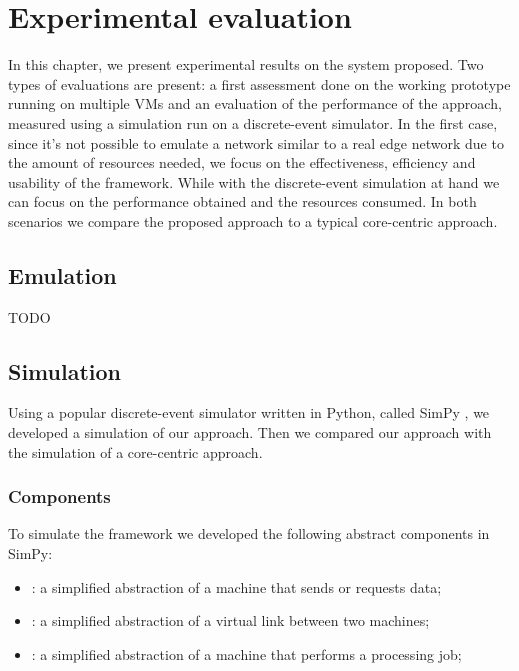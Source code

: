 \chapter{Experimental evaluation}
\label{ch:experiments}

In this chapter, we present experimental results on the system proposed. Two types of evaluations are present: a first assessment done on the working prototype running on multiple \glspl{VM} and an evaluation of the performance of the approach, measured using a simulation run on a discrete-event simulator.
In the first case, since it's not possible to emulate a network similar to a real edge network due to the amount of resources needed, we focus on the effectiveness, efficiency and usability of the framework.
While with the discrete-event simulation at hand we can focus on the performance obtained and the resources consumed.
In both scenarios we compare the proposed approach to a typical core-centric approach.



\section{Emulation}
TODO



\section{Simulation}
Using a popular discrete-event simulator written in Python, called SimPy \cite{simpy}, we developed a simulation of our approach. Then we compared our approach with the simulation of a core-centric approach.


\subsection{Components}
To simulate the framework we developed the following abstract components in SimPy:
\begin{itemize}
    \item {}: a simplified abstraction of a machine that sends or requests data;
    \item {}: a simplified abstraction of a virtual link between two machines;
    \item {}: a simplified abstraction of a machine that performs a processing job;
\end{itemize}

